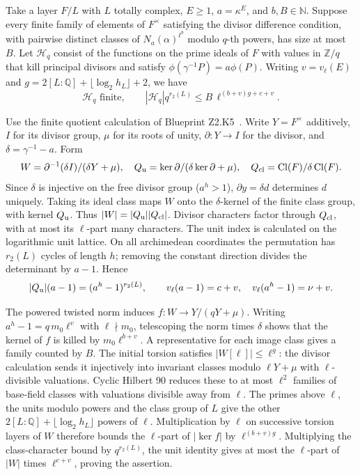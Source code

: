 \begin{formalstatement}\label{pn:P036}
Take a layer \(F/L\) with \(L\) totally complex, \(E\ge1\),
\(a=\kappa^E\), and \(b,B\in\mathbb N\). Suppose every finite family
of elements of \(F^\times\) satisfying the divisor difference condition,
with pairwise distinct classes of \(N_a(\alpha)^{\ell^b}\) modulo
\(q\)-th powers, has size at most \(B\). Let \(\mathcal H_q\) consist
of the functions on the prime ideals of \(F\) with values in
\(\mathbb Z/q\) that kill principal divisors and satisfy
\(\phi(\gamma^{-1}P)=a\phi(P)\). Writing \(v=v_\ell(E)\) and
\(g=2[L:\mathbb Q]+\lfloor\log_2 h_L\rfloor+2\), we have
\[
 \mathcal H_q\text{ finite},\qquad
 |\mathcal H_q|q^{r_2(L)}
       \le B\,\ell^{(b+v)g+c+v}.
\]
\end{formalstatement}
\begin{outline}
Use the finite quotient calculation of Blueprint Z2.K5~. Write \(Y=F^\times\)
additively, \(I\) for its divisor group, \(\mu\) for its roots of unity,
\(\partial:Y\to I\) for the divisor, and \(\delta=\gamma^{-1}-a\).
Form
\[
 W=\partial^{-1}(\delta I)/(\delta Y+\mu),\quad
 Q_{\rm u}=\ker\partial/(\delta\ker\partial+\mu),\quad
 Q_{\rm cl}=\operatorname{Cl}(F)/\delta\operatorname{Cl}(F).
\]
Since \(\delta\) is injective on the free divisor group (\(a^h>1\)),
\(\partial y=\delta d\) determines \(d\) uniquely. Taking its ideal
class maps \(W\) onto the \(\delta\)-kernel of the finite class group,
with kernel \(Q_{\rm u}\). Thus \(|W|=|Q_{\rm u}||Q_{\rm cl}|\).
Divisor characters factor through \(Q_{\rm cl}\), with at most its
\(\ell\)-part many characters. The unit index is calculated on the
logarithmic unit lattice. On all archimedean coordinates the
permutation has \(r_2(L)\) cycles of length \(h\); removing the
constant direction divides the determinant by \(a-1\). Hence
\[
 |Q_{\rm u}|(a-1)=(a^h-1)^{r_2(L)},\qquad
 v_\ell(a-1)=c+v,\quad v_\ell(a^h-1)=\nu+v.
\]

The powered twisted norm induces \(f:W\to Y/(qY+\mu)\).
Writing \(a^h-1=q\,m_0\ell^v\) with \(\ell\nmid m_0\), telescoping
the norm times \(\delta\) shows that the kernel of \(f\) is killed
by \(m_0\ell^{b+v}\). A representative for each image class gives
a family counted by \(B\). The initial torsion satisfies
\(\lvert W[\ell]\rvert\le\ell^g\): the divisor calculation sends it
injectively into invariant classes modulo \(\ell Y+\mu\) with
\(\ell\)-divisible valuations. Cyclic Hilbert 90 reduces these to
at most \(\ell^2\) families of base-field classes with valuations
divisible away from \(\ell\). The primes above \(\ell\), the units
modulo powers and the class group of \(L\) give the other
\(2[L:\mathbb Q]+\lfloor\log_2h_L\rfloor\) powers of \(\ell\).
Multiplication by \(\ell\) on successive torsion layers of \(W\)
therefore bounds the \(\ell\)-part of \(\lvert\ker f\rvert\) by
\(\ell^{(b+v)g}\). Multiplying the class-character bound by
\(q^{r_2(L)}\), the unit identity gives at most the \(\ell\)-part of
\(|W|\) times \(\ell^{c+v}\), proving the assertion.
\end{outline}

